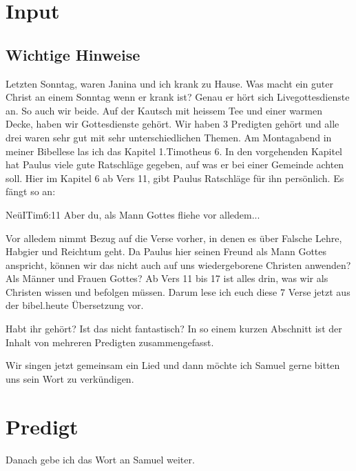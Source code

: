 \documentclass{../inc/mybib}
\begin{document}
\section{ Input }
\begin{spacing}{1.5}
\subsection{ Wichtige Hinweise }

Letzten Sonntag, waren Janina und ich krank zu Hause. Was macht ein guter Christ an einem Sonntag wenn er krank ist? Genau er hört sich Livegottesdienste an. So auch wir beide. Auf der Kautsch mit heissem Tee und einer warmen Decke, haben wir Gottesdienste gehört. Wir haben 3 Predigten gehört und alle drei waren sehr gut mit sehr unterschiedlichen Themen. Am Montagabend in meiner Bibellese las ich das Kapitel 1.Timotheus 6. In den vorgehenden Kapitel hat Paulus viele gute Ratschläge gegeben, auf was er bei einer Gemeinde achten soll. Hier im Kapitel 6 ab Vers 11, gibt Paulus Ratschläge für ihn persönlich. Es fängt so an:

\begin{bibeltext}{Neü}{ITim}{6:11}
Aber du, als Mann Gottes fliehe vor alledem...
\end{bibeltext}

 \glqq Vor alledem \grqq{} nimmt Bezug auf die Verse vorher, in denen es über Falsche Lehre, Habgier und Reichtum geht. Da Paulus hier seinen Freund als Mann Gottes anspricht, können wir das nicht auch auf uns wiedergeborene Christen anwenden? Als Männer und Frauen Gottes? Ab Vers 11 bis 17 ist alles drin, was wir als Christen wissen und befolgen müssen. Darum lese ich euch diese 7 Verse jetzt aus der bibel.heute Übersetzung vor.

Habt ihr gehört? Ist das nicht fantastisch? In so einem kurzen Abschnitt ist der Inhalt von mehreren Predigten zusammengefasst. 

Wir singen jetzt gemeinsam ein Lied und dann möchte ich Samuel gerne bitten uns sein Wort zu verkündigen.

\end{spacing}


\section{Predigt}

Danach gebe ich das Wort an Samuel weiter.
\end{document}
